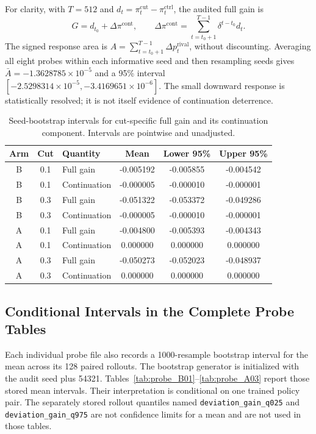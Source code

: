 \documentclass{article}
\begin{document}
For clarity, with $T=512$ and $d_t=\pi_t^{\mathrm{cut}}-\pi_t^{\mathrm{ctrl}}$, the audited full gain is
\[
G=d_{t_0}+\Delta\pi^{\mathrm{cont}},\qquad
\Delta\pi^{\mathrm{cont}}=\sum_{t=t_0+1}^{T-1}\delta^{t-t_0}d_t.
\]
The signed response area is $A=\sum_{t=t_0+1}^{T-1}\Delta p_t^{\mathrm{rival}}$, without discounting. Averaging all eight probes within each informative seed and then resampling seeds gives $\bar A=-1.3628785\times10^{-5}$ and a 95\% interval $[-2.5298314\times10^{-5},-3.4169651\times10^{-6}]$. The small downward response is statistically resolved; it is not itself evidence of continuation deterrence.

\begin{table}[t]
\centering
\caption{Seed-bootstrap intervals for cut-specific full gain and its continuation component. Intervals are pointwise and unadjusted.}
\label{tab:bootstrap_ci}
\small
{}
\begin{tabular}{@{}cc l SSS@{}}
\toprule
Arm & Cut & Quantity & {Mean} & {Lower 95\%} & {Upper 95\%} \\
\midrule
B & 0.1 & Full gain      & -0.005192 & -0.005855 & -0.004542 \\
B & 0.1 & Continuation   & -0.000005 & -0.000010 & -0.000001 \\
B & 0.3 & Full gain      & -0.051322 & -0.053372 & -0.049286 \\
B & 0.3 & Continuation   & -0.000005 & -0.000010 & -0.000001 \\
A & 0.1 & Full gain      & -0.004800 & -0.005393 & -0.004343 \\
A & 0.1 & Continuation   &  0.000000 &  0.000000 &  0.000000 \\
A & 0.3 & Full gain      & -0.050273 & -0.052023 & -0.048937 \\
A & 0.3 & Continuation   &  0.000000 &  0.000000 &  0.000000 \\
\bottomrule
\end{tabular}
\end{table}

\subsection{Conditional Intervals in the Complete Probe Tables}

Each individual probe file also records a \num{1000}-resample bootstrap interval for the mean across its 128 paired rollouts. The bootstrap generator is initialized with the audit seed plus \num{54321}. Tables~\ref{tab:probe_B01}--\ref{tab:probe_A03} report those stored mean intervals. Their interpretation is conditional on one trained policy pair. The separately stored rollout quantiles named \texttt{deviation\_gain\_q025} and \texttt{deviation\_gain\_q975} are not confidence limits for a mean and are not used in those tables.
\end{document}

